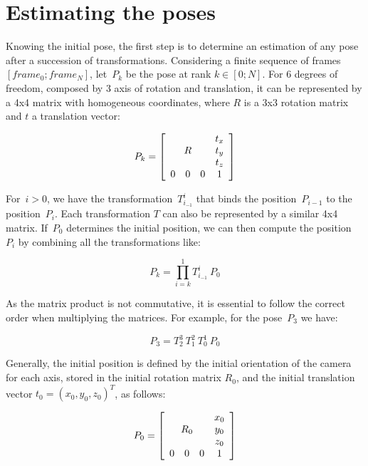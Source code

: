 \section{Estimating the poses}

Knowing the initial pose, the first step is to determine an estimation of any pose after a succession of transformations. Considering a finite sequence of frames $[frame_0 ; frame_N]$, let~$P_k$ be the pose at rank $k \in [0;N]$. For 6 degrees of freedom, composed by 3 axis of rotation and translation, it can be represented by a 4x4 matrix with homogeneous coordinates, where $R$ is a 3x3 rotation matrix and $t$ a translation vector:

$$
P_k = \left[ \begin{array}{cccc}
 \multicolumn{3}{c}{\multirow{3}{*}{$R$}} & t_x \\
 & & & t_y \\
 & & & t_z \\
0 & 0 & 0 & 1 \end{array} \right] 
$$

For~$i>0$, we have the transformation~$T_{i_{-1}}^i$ that binds the position~$P_{i-1}$ to the position~$P_i$. Each transformation $T$ can also be represented by a similar 4x4 matrix. If~$P_0$ determines the initial position, we can then compute the position~$P_i$  by combining all the transformations like:

\begin{equation}
P_k = \prod_{i=k}^1{T_{i_{-1}}^i} \: P_0
\label{eqn:pose_estimation}
\end{equation}

As the matrix product is not commutative, it is essential to follow the correct order when multiplying the matrices. For example, for the pose~$P_3$ we have:

\[
P_3 = T_2^3 \: T_1^2 \: T_0^1 \: P_0
\]

Generally, the initial position is defined by the initial orientation of the camera for each axis, stored in the initial rotation matrix $R_0$, and the initial translation vector $t_0 = (x_0, y_0, z_0)^T$, as follows:

\[
P_0 = \left[ \begin{array}{cccc}
 \multicolumn{3}{c}{\multirow{3}{*}{$R_0$}} & x_0 \\
 & & & y_0 \\
 & & & z_0 \\
0 & 0 & 0 & 1 \end{array} \right] 
\]

